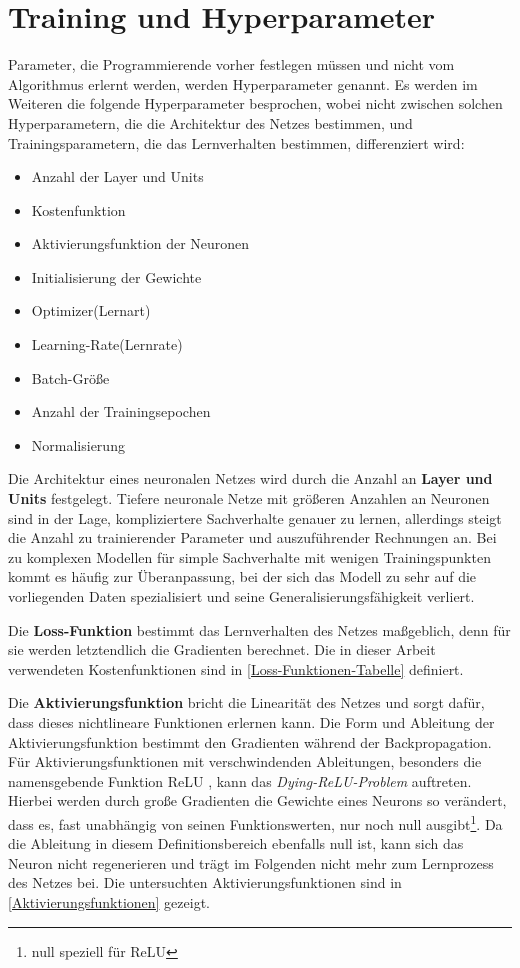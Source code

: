 \section{Training und Hyperparameter}
\label{Training und Hyperparameter}
Parameter, die Programmierende vorher festlegen müssen und nicht vom Algorithmus erlernt werden, werden Hyperparameter genannt. Es werden im Weiteren die folgende Hyperparameter besprochen, wobei nicht zwischen solchen Hyperparametern, die die Architektur des Netzes bestimmen, und Trainingsparametern, die das Lernverhalten bestimmen, differenziert wird:
\begin{multicols}{2}
	\begin{itemize}
	\setlength\itemsep{0cm}
	\setlength{\parskip}{0cm}
		\item Anzahl der Layer und Units
		\item Kostenfunktion
		\item Aktivierungsfunktion der Neuronen
		\item Initialisierung der Gewichte
		\item Optimizer(Lernart) 
		\item Learning-Rate(Lernrate)
		\item Batch-Größe
		\item Anzahl der Trainingsepochen
		\item Normalisierung
	\end{itemize}
\end{multicols}
Die Architektur eines neuronalen Netzes wird durch die Anzahl an \textbf{Layer und Units} festgelegt.
Tiefere neuronale Netze mit größeren Anzahlen an Neuronen sind in der Lage, kompliziertere Sachverhalte genauer zu lernen, allerdings steigt die Anzahl zu trainierender Parameter und auszuführender Rechnungen an. Bei zu komplexen Modellen für simple Sachverhalte mit wenigen Trainingspunkten kommt es häufig zur Überanpassung, bei der sich das Modell zu sehr auf die vorliegenden Daten spezialisiert und seine Generalisierungsfähigkeit verliert.

Die \textbf{Loss-Funktion} bestimmt das Lernverhalten des Netzes maßgeblich, denn für sie werden letztendlich die Gradienten berechnet. Die in dieser Arbeit verwendeten Kostenfunktionen sind in \textsf{\autoref{Loss-Funktionen-Tabelle}} definiert.

Die \textbf{Aktivierungsfunktion} bricht die Linearität des Netzes und sorgt dafür, dass dieses nichtlineare Funktionen erlernen kann.  Die Form und Ableitung der Aktivierungsfunktion bestimmt den Gradienten während der Backpropagation. Für Aktivierungsfunktionen mit verschwindenden Ableitungen, besonders die namensgebende Funktion ReLU \cite{ReLU}, kann das \textit{Dying-ReLU-Problem} auftreten. Hierbei werden durch große Gradienten die Gewichte eines Neurons so verändert, dass es, fast unabhängig von seinen Funktionswerten, nur noch null ausgibt\footnote{null speziell für ReLU}. Da die Ableitung in diesem Definitionsbereich ebenfalls null ist, kann sich das Neuron nicht regenerieren und trägt im Folgenden nicht mehr zum Lernprozess des Netzes bei. Die untersuchten Aktivierungsfunktionen sind in \textsf{\autoref{Aktivierungsfunktionen}} gezeigt.

